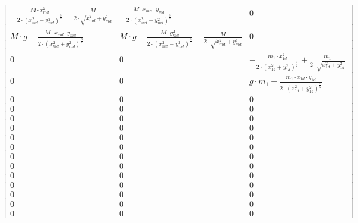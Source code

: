 $$\left[\begin{matrix}- \frac{M \cdot x_{m d}^{2}}{2 \cdot \left(x_{m d}^{2} + y_{m d}^{2}\right)^{\frac{3}{2}}} + \frac{M}{2 \cdot \sqrt{x_{m d}^{2} + y_{m d}^{2}}} & - \frac{M \cdot x_{m d} \cdot y_{m d}}{2 \cdot \left(x_{m d}^{2} + y_{m d}^{2}\right)^{\frac{3}{2}}} & 0\\M \cdot g - \frac{M \cdot x_{m d} \cdot y_{m d}}{2 \cdot \left(x_{m d}^{2} + y_{m d}^{2}\right)^{\frac{3}{2}}} & M \cdot g - \frac{M \cdot y_{m d}^{2}}{2 \cdot \left(x_{m d}^{2} + y_{m d}^{2}\right)^{\frac{3}{2}}} + \frac{M}{2 \cdot \sqrt{x_{m d}^{2} + y_{m d}^{2}}} & 0\\0 & 0 & - \frac{m_{1} \cdot x_{1 d}^{2}}{2 \cdot \left(x_{1 d}^{2} + y_{1 d}^{2}\right)^{\frac{3}{2}}} + \frac{m_{1}}{2 \cdot \sqrt{x_{1 d}^{2} + y_{1 d}^{2}}}\\0 & 0 & g \cdot m_{1} - \frac{m_{1} \cdot x_{1 d} \cdot y_{1 d}}{2 \cdot \left(x_{1 d}^{2} + y_{1 d}^{2}\right)^{\frac{3}{2}}}\\0 & 0 & 0\\0 & 0 & 0\\0 & 0 & 0\\0 & 0 & 0\\0 & 0 & 0\\0 & 0 & 0\\0 & 0 & 0\\0 & 0 & 0\\0 & 0 & 0\\0 & 0 & 0\\0 & 0 & 0\\0 & 0 & 0\\0 & 0 & 0\end{matrix}\right]$$


